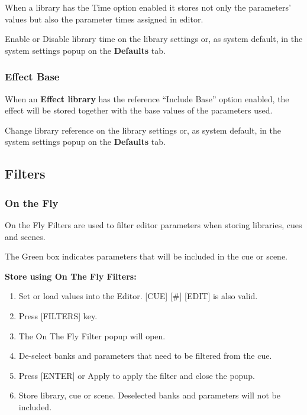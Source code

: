 \documentclass[
]{article}
\begin{document}
When a library has the Time option enabled it stores not only the parameters' values but also the parameter times assigned in editor.

Enable or Disable library time on the library settings or, as system default, in the system settings popup on the \textbf{Defaults} tab.

\hypertarget{effect-base}{%
\subsubsection{Effect Base}\label{effect-base}}

When an \textbf{Effect library} has the reference ``Include Base'' option enabled, the effect will be stored together with the base values of the parameters used.

Change library reference on the library settings or, as system default, in the system settings popup on the \textbf{Defaults} tab.

\hypertarget{Filters-8.4}{%
\subsection{Filters}\label{Filters-8.4}}

\hypertarget{on-the-fly}{%
\subsubsection{On the Fly}\label{on-the-fly}}

On the Fly Filters are used to filter editor parameters when storing libraries, cues and scenes.

The Green box indicates parameters that will be included in the cue or scene.

\textbf{Store using On The Fly Filters:}

\begin{enumerate}
\def\labelenumi{\arabic{enumi}.}
\item
  Set or load values into the Editor. {[}CUE{]} {[}\#{]} {[}EDIT{]} is also valid.
\item
  Press {[}FILTERS{]} key.
\item
  The On The Fly Filter popup will open.
\item
  De-select banks and parameters that need to be filtered from the cue.
\item
  Press {[}ENTER{]} or Apply to apply the filter and close the popup.
\item
  Store library, cue or scene. Deselected banks and parameters will not be included.
\end{enumerate}
\end{document}

